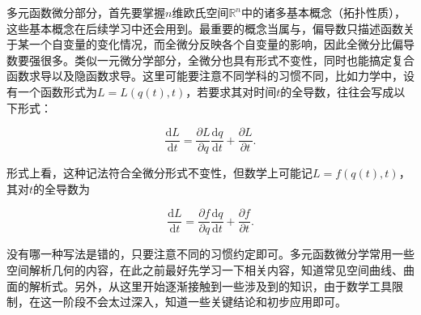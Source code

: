 \begin{figwindow}[0,r,
        {\texttt{[image: partial.pdf]}},
        二元函数$z=z(x,y)$的偏导数]
    多元函数微分部分，首先要掌握$n$维欧氏空间$\mathbb{R}^n$中的诸多基本概念（拓扑性质），这些基本概念在后续学习中还会用到。最重要的概念当属与，偏导数只描述函数关于某一个自变量的变化情况，而全微分反映各个自变量的影响，因此全微分比偏导数要强很多。类似一元微分学部分，全微分也具有形式不变性，同时也能搞定复合函数求导以及隐函数求导。这里可能要注意不同学科的习惯不同，比如力学中，设有一个函数形式为$L=L(q(t),t)$，若要求其对时间$t$的全导数，往往会写成以下形式：
\end{figwindow}

\[
    \frac{\mathrm{d}L}{\mathrm{d}t}=\frac{\partial L}{\partial q}\frac{\mathrm{d}q}{\mathrm{d}t}+\frac{\partial L}{\partial t}
    .\]

形式上看，这种记法符合全微分形式不变性，但数学上可能记$L=f(q(t),t)$，其对$t$的全导数为

\[
    \frac{\mathrm{d}L}{\mathrm{d}t}=\frac{\partial f}{\partial q}\frac{\mathrm{d}q}{\mathrm{d}t}+\frac{\partial f}{\partial t}
    .\]

没有哪一种写法是错的，只要注意不同的习惯约定即可。多元函数微分学常用一些空间解析几何的内容，在此之前最好先学习一下相关内容，知道常见空间曲线、曲面的解析式。另外，从这里开始逐渐接触到一些涉及到的知识，由于数学工具限制，在这一阶段不会太过深入，知道一些关键结论和初步应用即可。


